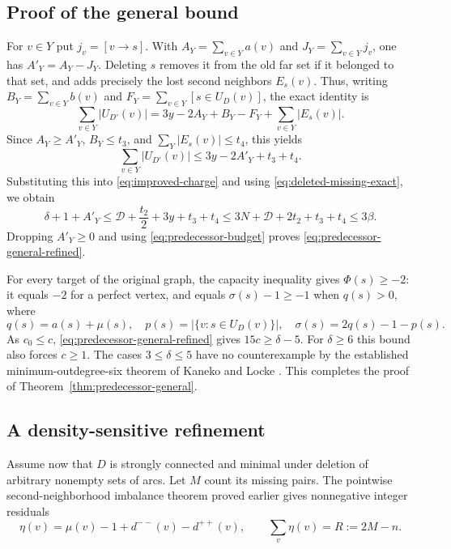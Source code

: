 \subsection{Proof of the general bound}

For $v\in Y$ put $j_v=[v\to s]$.  With
$A_Y=\sum_{v\in Y}a(v)$ and $J_Y=\sum_{v\in Y}j_v$, one has
$A'_Y=A_Y-J_Y$.  Deleting $s$ removes it from the old far set if
it belonged to that set, and adds precisely the lost second neighbors
$E_s(v)$.  Thus, writing $B_Y=\sum_{v\in Y}b(v)$ and
$F_Y=\sum_{v\in Y}[s\in U_D(v)]$, the exact identity is
\begin{equation}\label{eq:source-demand-exact}
 \sum_{v\in Y}|U_{D'}(v)|
       =3y-2A_Y+B_Y-F_Y+\sum_{v\in Y}|E_s(v)|.
\end{equation}
Since $A_Y\ge A'_Y$, $B_Y\le t_3$, and
$\sum_Y|E_s(v)|\le t_4$, this yields
\[
 \sum_{v\in Y}|U_{D'}(v)|\le3y-2A'_Y+t_3+t_4.
\]
Substituting this into \eqref{eq:improved-charge} and using
\eqref{eq:deleted-missing-exact}, we obtain
\[
 \delta+1+A'_Y\le\mathcal D+\frac{t_2}{2}+3y+t_3+t_4
 \le3N+\mathcal D+2t_2+t_3+t_4\le3\beta.
\]
Dropping $A'_Y\ge0$ and using \eqref{eq:predecessor-budget} proves
\eqref{eq:predecessor-general-refined}.

For every target of the original graph, the capacity inequality gives
$\Phi(s)\ge-2$: it equals $-2$ for a perfect vertex, and equals
$\sigma(s)-1\ge-1$ when $q(s)>0$, where
\[
 q(s)=a(s)+\mu(s),\quad
 p(s)=|\{v:s\in U_D(v)\}|,\quad
 \sigma(s)=2q(s)-1-p(s).
\]
As $c_0\le c$, \eqref{eq:predecessor-general-refined} gives
$15c\ge\delta-5$.  For $\delta\ge6$ this bound also forces $c\ge1$. The cases
$3\le\delta\le5$ have no counterexample by the established
minimum-outdegree-six theorem of Kaneko and Locke \cite{KanekoLocke2001}.  This completes the proof of
Theorem~\ref{thm:predecessor-general}.

\subsection{A density-sensitive refinement}

Assume now that $D$ is strongly connected and minimal under deletion
of arbitrary nonempty sets of arcs.  Let $M$ count its missing pairs.
The pointwise second-neighborhood imbalance theorem proved earlier
gives nonnegative integer residuals
\[
 \eta(v)=\mu(v)-1+d^{--}(v)-d^{++}(v),\qquad
 \sum_v\eta(v)=R:=2M-n.
\]

